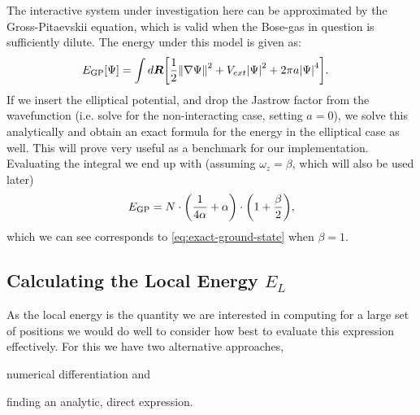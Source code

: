 \documentclass[twocolumn]{article}
\begin{document}
The interactive system under investigation here can be approximated by the
Gross-Pitaevskii equation, which is valid when the Bose-gas in question is
sufficiently dilute. The energy under this model is given
as\cite{Nilsen-phys-rev}:
\begin{align}
    \begin{split}
    &E_{\text{GP}}[\Psi]=
        \int
        d\bm{R}\bigg[\frac{1}{2}\norm{\nabla\Psi}^2+V_{ext}\abs{\Psi}^2+2\pi a\abs{\Psi}^4\bigg].
\label{eq:GP_integral}
    \end{split}
\end{align}
If we insert the elliptical potential, and drop the Jastrow factor from the
wavefunction (i.e. solve for the non-interacting case, setting $a=0$), we solve
this analytically and obtain an exact formula for the energy in the elliptical
case as  well. This will prove very useful as a benchmark for our
implementation. Evaluating the integral we end up with (assuming
$\omega_z=\beta$, which will also be used later)
\begin{align}
    E_\text{GP} = N\cdot
    \qty(\frac{1}{4\alpha}+\alpha)\cdot\qty(1+\frac{\beta}{2}),\label{eq:GP-final}
\end{align}
which we can see corresponds to \eqref{eq:exact-ground-state} when $\beta=1$.

\subsection{Calculating the Local Energy $E_L$}
As the local energy is the quantity we are interested in computing for a
large set of positions we would do well to consider how best to evaluate this
expression effectively. For this we have two alternative approaches,
\begin{inparaenum}[1)]
    \item numerical differentiation and
    \item finding an analytic, direct expression.
\end{inparaenum}
\end{document}
